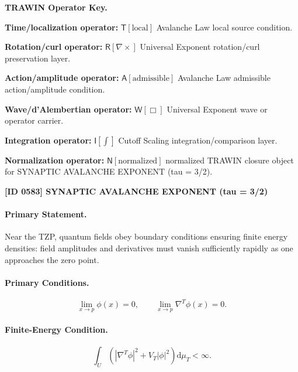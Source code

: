 \par\vspace{0.45\baselineskip}
\noindent\begin{minipage}[t]{\linewidth}
\begingroup
\small
\raggedright
\textbf{TRAWIN Operator Key.}\par
\noindent\textbf{Time/localization operator:} $\mathsf{T}\!\left[\mathrm{local}\right]$ Avalanche Law local source condition.\par
\noindent\textbf{Rotation/curl operator:} $\mathsf{R}\!\left[\nabla\times\right]$ Universal Exponent rotation/curl preservation layer.\par
\noindent\textbf{Action/amplitude operator:} $\mathsf{A}\!\left[\mathrm{admissible}\right]$ Avalanche Law admissible action/amplitude condition.\par
\noindent\textbf{Wave/d'Alembertian operator:} $\mathsf{W}\!\left[\Box\right]$ Universal Exponent wave or operator carrier.\par
\noindent\textbf{Integration operator:} $\mathsf{I}\!\left[\int\right]$ Cutoff Scaling integration/comparison layer.\par
\noindent\textbf{Normalization operator:} $\mathsf{N}\!\left[\mathrm{normalized}\right]$ normalized TRAWIN closure object for SYNAPTIC AVALANCHE EXPONENT (tau = 3/2).\par
\endgroup
\end{minipage}

\clearpage
\noindent\textbf{[ID 0583] SYNAPTIC AVALANCHE EXPONENT (tau = 3/2)}\par
\vspace{0.35em}
\paragraph{Primary Statement.}
Near the TZP, quantum fields obey boundary conditions ensuring finite energy densities: field amplitudes and derivatives must vanish sufficiently rapidly as one approaches the zero point.

\paragraph{Primary Conditions.}
\begin{equation}
\lim_{x\to p}\phi(x)=0,
\qquad
\lim_{x\to p}\nabla^T\phi(x)=0 .
\end{equation}

\paragraph{Finite-Energy Condition.}
\begin{equation}
\int_U
\left(
|\nabla^T\phi|^2
+
V_T|\phi|^2
\right)
\mathrm{d}\mu_T
<\infty .
\end{equation}

